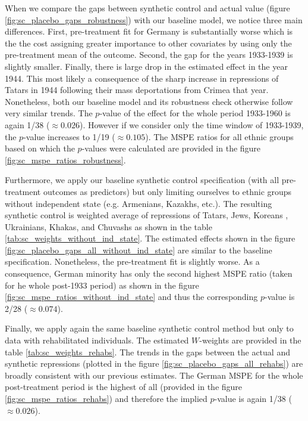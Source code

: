 

When we compare the gaps between synthetic control and actual value (figure \ref{fig:sc_placebo_gaps_robustness}) with our baseline model, we notice three main differences. First, pre-treatment fit for Germany is substantially worse which is the the cost
assigning greater importance to other covariates by  using only the pre-treatment mean of the outcome. Second, the gap for the years 1933-1939 is slightly smaller. Finally, there is large drop in the estimated effect in the year 1944. This most likely a consequence of the sharp increase in repressions of Tatars in 1944 following their mass deportations from Crimea that year. 
Nonetheless, both our baseline model and its robustness check otherwise follow very similar trends.
The $p$-value of the effect for the whole period 1933-1960  is again 1/38 ($\approx 0.026$). However if we consider only the time window of  1933-1939, the 
$p$-value increases to 1/19 ($\approx 0.105$). The MSPE ratios for all ethnic groups based on which the $p$-values were calculated are provided in the figure \ref{fig:sc_mspe_ratios_robustness}.

Furthermore, we apply our baseline  synthetic control specification (with all pre-treatment outcomes as predictors) but only limiting ourselves to ethnic groups without independent state (e.g. Armenians, Kazakhs, etc.). The resulting synthetic control is weighted average of repressions of Tatars, Jews, Koreans , Ukrainians, Khakas, and Chuvashs as shown in the table \ref{tab:sc_weights_without_ind_state}. The estimated effects shown in the figure \ref{fig:sc_placebo_gaps_all_without_ind_state} are  similar to the baseline specification. Nonetheless, the pre-treatment fit is slightly worse. As a consequence, German minority has only the second highest MSPE ratio (taken for he whole post-1933 period) as shown in the figure \ref{fig:sc_mspe_ratios_without_ind_state} and thus the corresponding $p$-value is 2/28 ($\approx 0.074$).

Finally, we apply again the same baseline synthetic control method but only to data with rehabilitated individuals. The estimated $W$-weights are provided in the table \ref{tab:sc_weights_rehabs}. The trends in the gaps between the actual and synthetic repressions (plotted in the figure  \ref{fig:sc_placebo_gaps_all_rehabs}) are broadly consistent with  our previous estimates. 
The German MSPE for the whole post-treatment period is the highest of all (provided in the figure \ref{fig:sc_mspe_ratios_rehabs}) and therefore the implied $p$-value is again  1/38 ($\approx 0.026$).

%
%

